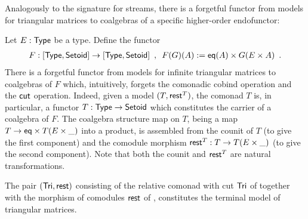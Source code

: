 \documentclass[a4paper,USenglish]{lipics}
\begin{document}
Analogously to the signature for streams, there is a forgetful functor from models for triangular matrices to coalgebras of a specific higher-order
endofunctor:

\begin{rem}
  Let $E : \mathsf{Type}$ be a type. Define the functor
  \begin{align*}  F: [\mathsf{Type},\mathsf{Setoid}] \to [\mathsf{Type},\mathsf{Setoid}]  \enspace ,\enspace
                      F(G)(A) := \mathsf{eq}(A) \times G(E \times A) \enspace .
  \end{align*}
  There is a forgetful functor from models for infinite triangular matrices to coalgebras of $F$ which, intuitively, forgets the comonadic cobind operation and the $\mathsf{cut}$ operation.
  Indeed, given a model $(T,\mathsf{rest}^T)$, the comonad $T$ is, in particular, a functor $T:\mathsf{Type}\to\mathsf{Setoid}$ which constitutes the carrier of 
  a coalgebra of $F$. The coalgebra structure map on $T$, being a map $T \to \mathsf{eq} \times T(E\times \_ )$ into a product, 
  is assembled from the counit of $T$ (to give the first component) 
  and the comodule morphism $\mathsf{rest}^T : T \to T(E\times \_)$ (to give the second component).
  Note that both the counit and $\mathsf{rest}^T$ are natural transformations.
\end{rem}


   

\begin{thm}\label{ex:final_sem_tri} 
   The pair $(\mathsf{Tri}, \mathsf{rest})$ consisting of the relative comonad with cut $\mathsf{Tri}$ of  together with 
    the morphism of comodules $\mathsf{rest}$ of ,
   constitutes the terminal model of triangular matrices.
\end{thm}
\end{document}
